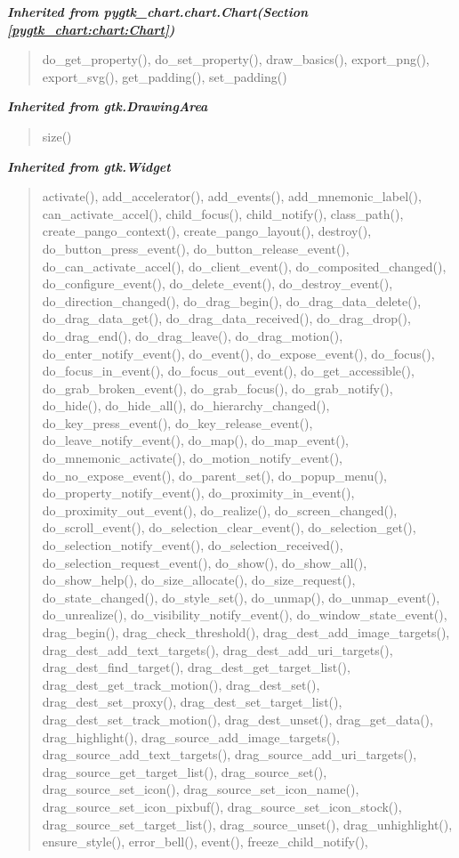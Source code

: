 \large{\textbf{\textit{Inherited from pygtk\_chart.chart.Chart\textit{(Section \ref{pygtk_chart:chart:Chart})}}}}

\begin{quote}
do\_get\_property(), do\_set\_property(), draw\_basics(), export\_png(), export\_svg(), get\_padding(), set\_padding()
\end{quote}

\large{\textbf{\textit{Inherited from gtk.DrawingArea}}}

\begin{quote}
size()
\end{quote}

\large{\textbf{\textit{Inherited from gtk.Widget}}}

\begin{quote}
activate(), add\_accelerator(), add\_events(), add\_mnemonic\_label(), can\_activate\_accel(), child\_focus(), child\_notify(), class\_path(), create\_pango\_context(), create\_pango\_layout(), destroy(), do\_button\_press\_event(), do\_button\_release\_event(), do\_can\_activate\_accel(), do\_client\_event(), do\_composited\_changed(), do\_configure\_event(), do\_delete\_event(), do\_destroy\_event(), do\_direction\_changed(), do\_drag\_begin(), do\_drag\_data\_delete(), do\_drag\_data\_get(), do\_drag\_data\_received(), do\_drag\_drop(), do\_drag\_end(), do\_drag\_leave(), do\_drag\_motion(), do\_enter\_notify\_event(), do\_event(), do\_expose\_event(), do\_focus(), do\_focus\_in\_event(), do\_focus\_out\_event(), do\_get\_accessible(), do\_grab\_broken\_event(), do\_grab\_focus(), do\_grab\_notify(), do\_hide(), do\_hide\_all(), do\_hierarchy\_changed(), do\_key\_press\_event(), do\_key\_release\_event(), do\_leave\_notify\_event(), do\_map(), do\_map\_event(), do\_mnemonic\_activate(), do\_motion\_notify\_event(), do\_no\_expose\_event(), do\_parent\_set(), do\_popup\_menu(), do\_property\_notify\_event(), do\_proximity\_in\_event(), do\_proximity\_out\_event(), do\_realize(), do\_screen\_changed(), do\_scroll\_event(), do\_selection\_clear\_event(), do\_selection\_get(), do\_selection\_notify\_event(), do\_selection\_received(), do\_selection\_request\_event(), do\_show(), do\_show\_all(), do\_show\_help(), do\_size\_allocate(), do\_size\_request(), do\_state\_changed(), do\_style\_set(), do\_unmap(), do\_unmap\_event(), do\_unrealize(), do\_visibility\_notify\_event(), do\_window\_state\_event(), drag\_begin(), drag\_check\_threshold(), drag\_dest\_add\_image\_targets(), drag\_dest\_add\_text\_targets(), drag\_dest\_add\_uri\_targets(), drag\_dest\_find\_target(), drag\_dest\_get\_target\_list(), drag\_dest\_get\_track\_motion(), drag\_dest\_set(), drag\_dest\_set\_proxy(), drag\_dest\_set\_target\_list(), drag\_dest\_set\_track\_motion(), drag\_dest\_unset(), drag\_get\_data(), drag\_highlight(), drag\_source\_add\_image\_targets(), drag\_source\_add\_text\_targets(), drag\_source\_add\_uri\_targets(), drag\_source\_get\_target\_list(), drag\_source\_set(), drag\_source\_set\_icon(), drag\_source\_set\_icon\_name(), drag\_source\_set\_icon\_pixbuf(), drag\_source\_set\_icon\_stock(), drag\_source\_set\_target\_list(), drag\_source\_unset(), drag\_unhighlight(), ensure\_style(), error\_bell(), event(), freeze\_child\_notify(), 
\end{quote}

